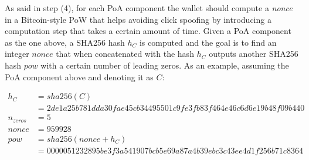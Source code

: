 As said in step \textsf{(4)}, for each \textsf{PoA} component the wallet should compute a \textit{nonce} in a Bitcoin-style \textsf{PoW} that helps avoiding click spoofing by introducing a computation step that takes a certain amount of time. Given a \textsf{PoA} component as the one above, a \textsf{SHA256} hash $h_C$ is computed and the goal is to find an integer $nonce$ that when concatenated with the hash $h_C$ outputs another \textsf{SHA256} hash $pow$ with a certain number of leading zeros. As an example, assuming the \textsf{PoA} component above and denoting it as $C$:
\begin{tcolorbox}[enhanced jigsaw,sharp corners, drop fuzzy shadow=ShadowColor]
\begin{align*}
h_C &= sha256(C) \\
	    &= 2de1a25b781dda30fae45cb34495501c9fe3fb83f464e46c6d6e19b48f09b440 \\
n_{zeros} &= 5 \\
nonce &= 959928 \\
pow &= sha256(nonce + h_C) \\
		       &= 0000051232895be3f3a541907bcb5e69a87a4b39ebc3c43ee4d1f256b71c8364
\end{align*}
\end{tcolorbox}

